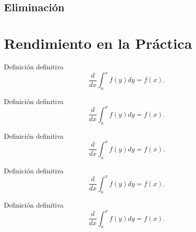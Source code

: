 \subsection{Eliminación}

\section{Rendimiento en la Práctica}

\begin{defn} Definición definitiva $$\frac{d}{dx}\int_a^xf(y)dy=f(x).$$\end{defn}

\begin{teo} Definición definitiva $$\frac{d}{dx}\int_a^xf(y)dy=f(x).$$\end{teo}

\begin{prop} Definición definitiva $$\frac{d}{dx}\int_a^xf(y)dy=f(x).$$\end{prop}

\begin{obs} Definición definitiva $$\frac{d}{dx}\int_a^xf(y)dy=f(x).$$\end{obs}

\begin{ej} Definición definitiva $$\frac{d}{dx}\int_a^xf(y)dy=f(x).$$\end{ej}